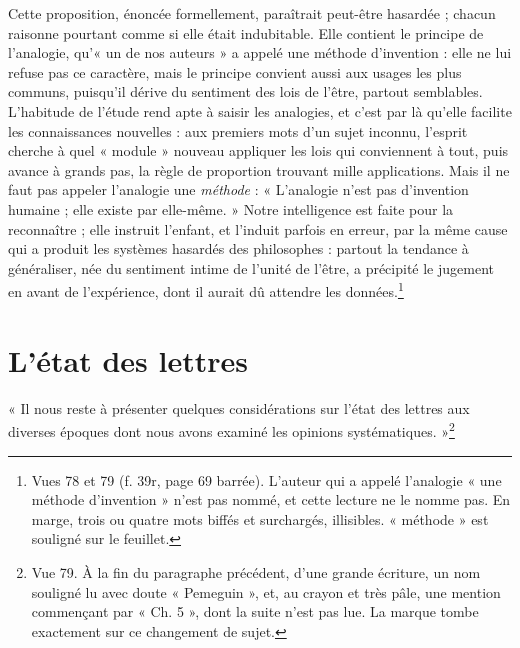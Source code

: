 \documentclass[11pt,a4paper]{article}
\begin{document}
Cette proposition, énoncée formellement, paraîtrait peut-être hasardée ; chacun
raisonne pourtant comme si elle était indubitable. Elle contient le principe de
l'analogie, qu'« un de nos auteurs » a appelé une méthode d'invention : elle ne
lui refuse pas ce caractère, mais le principe convient aussi aux usages les plus
communs, puisqu'il dérive du sentiment des lois de l'être, partout semblables.
L'habitude de l'étude rend apte à saisir les analogies, et c'est par là qu'elle
facilite les connaissances nouvelles : aux premiers mots d'un sujet inconnu,
l'esprit cherche à quel « module » nouveau appliquer les lois qui conviennent à
tout, puis avance à grands pas, la règle de proportion trouvant mille
applications. Mais il ne faut pas appeler l'analogie une \emph{méthode} :
« L'analogie n'est pas d'invention humaine ; elle existe par elle-même. » Notre
intelligence est faite pour la reconnaître ; elle instruit l'enfant, et l'induit
parfois en erreur, par la même cause qui a produit les systèmes hasardés des
philosophes : partout la tendance à généraliser, née du sentiment intime de
l'unité de l'être, a précipité le jugement en avant de l'expérience, dont il
aurait dû attendre les données.\footnote{Vues 78 et 79 (f. 39r, page 69
barrée). L'auteur qui a appelé l'analogie « une méthode d'invention » n'est pas
nommé, et cette lecture ne le nomme pas. En marge, trois ou quatre mots biffés
et surchargés, illisibles. « méthode » est souligné sur le feuillet.}

\section*{L'état des lettres}

« Il nous reste à présenter quelques considérations sur l'état des lettres aux
diverses époques dont nous avons examiné les opinions systématiques. »\footnote{Vue
79. À la fin du paragraphe précédent, d'une grande écriture, un nom souligné lu
avec doute « Pemeguin », et, au crayon et très pâle, une mention commençant par
« Ch. 5 », dont la suite n'est pas lue. La marque tombe exactement sur ce
changement de sujet.}
\end{document}
